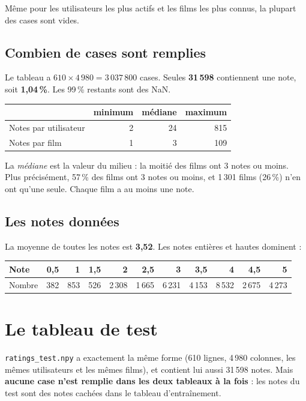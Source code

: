 \documentclass[11pt,a4paper]{article}
\begin{document}
Même pour les utilisateurs les plus actifs et les films les plus connus, la plupart des
cases sont vides.

\subsection{Combien de cases sont remplies}

Le tableau a $610 \times 4\,980 = 3\,037\,800$ cases. Seules \textbf{31\,598} contiennent
une note, soit \textbf{1,04\,\%}. Les 99\,\% restants sont des NaN.

\begin{center}
\begin{tabular}{lrrr}
\toprule
 & \textbf{minimum} & \textbf{médiane} & \textbf{maximum} \\
\midrule
Notes par utilisateur & 2 & 24 & 815 \\
Notes par film & 1 & 3 & 109 \\
\bottomrule
\end{tabular}
\end{center}

La \emph{médiane} est la valeur du milieu : la moitié des films ont 3 notes ou moins.
Plus précisément, 57\,\% des films ont 3 notes ou moins, et 1\,301 films (26\,\%) n'en
ont qu'une seule. Chaque film a au moins une note.

\subsection{Les notes données}

La moyenne de toutes les notes est \textbf{3,52}. Les notes entières et hautes dominent :

\begin{center}
\begin{tabular}{lrrrrrrrrrr}
\toprule
Note & 0,5 & 1 & 1,5 & 2 & 2,5 & 3 & 3,5 & 4 & 4,5 & 5 \\
\midrule
Nombre & 382 & 853 & 526 & 2\,308 & 1\,665 & 6\,231 & 4\,153 & 8\,532 & 2\,675 & 4\,273 \\
\bottomrule
\end{tabular}
\end{center}

\section{Le tableau de test}

\texttt{ratings\_test.npy} a exactement la même forme (610 lignes, 4\,980 colonnes, les
mêmes utilisateurs et les mêmes films), et contient lui aussi 31\,598 notes. Mais
\textbf{aucune case n'est remplie dans les deux tableaux à la fois} : les notes du test
sont des notes cachées dans le tableau d'entraînement.
\end{document}

